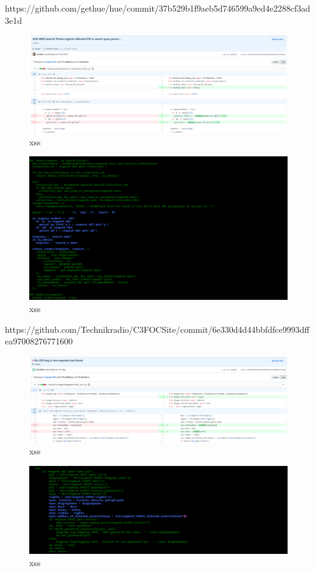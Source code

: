 \documentclass[
a4paper,
pagesize,
pdftex,
12pt,
twoside, %
BCOR=5mm, %
ngerman,
fleqn,
final,
]{scrartcl}
\begin{document}
https://github.com/gethue/hue/commit/37b529b1f9aeb5d746599a9ed4e2288cf3ad3e1d


\begin{figure}[h]
	\centering
	\includegraphics[width=\linewidth]{Images/xss2}
	\caption{xss}
	\label{fig:xss2}
\end{figure}
\begin{figure}[h]
	\centering
	\includegraphics[width=\linewidth]{Images/xss2r}
	\caption{xss}
	\label{fig:xss2r}
\end{figure}


https://github.com/Technikradio/C3FOCSite/commit/6e330d4d44bbfdfce9993dffea97008276771600



\begin{figure}[h]
	\centering
	\includegraphics[width=\linewidth]{Images/xss3}
	\caption{xss}
	\label{fig:xss3}
\end{figure}
\begin{figure}[h]
	\centering
	\includegraphics[width=\linewidth]{Images/xss3r}
	\caption{xss}
	\label{fig:xss3r}
\end{figure}
\end{document}
